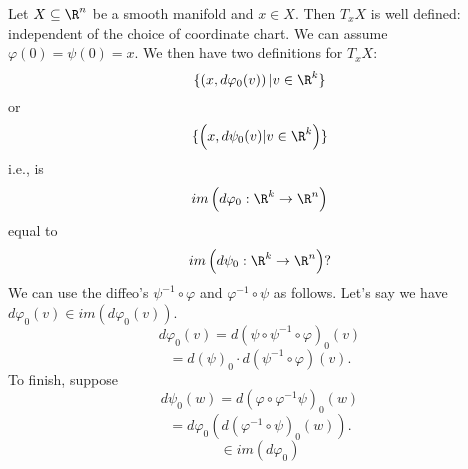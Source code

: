 \begin{proposition}
  Let $X \subseteq \R^n$ be a smooth manifold and $x\in X$. Then $T_xX$ is well defined: independent of the choice of coordinate chart.
  \newline We can assume $\varphi (0)=\psi(0)=x$. We then have two definitions for $T_xX$:
    $$\{\left(x,d   \varphi_{0}(v) \right) | v\in \R^k\}$$
    or
    $$\{\left(x,d\psi_{0}(v)| v\in \R^k\right)\}$$
    i.e., is
      $$im \left(d\varphi_0:\R^k\to \R^n\right)$$
      equal to
      $$im \left(d\psi_0:\R^k\to \R^n \right)?$$
    We can use the diffeo's $\psi^{-1}\circ \varphi$ and $\varphi ^{-1}\circ \psi$ as follows.
    Let's say we have $d \varphi _0(v)\in im(d\varphi_0(v))$.
      $$ d \varphi _0(v)=d \left(\psi \circ \psi ^{-1}\circ \varphi \right)_0(v) $$
      $$=d(\psi)_0 \cdot d \left(\psi ^{-1}\circ \varphi  \right)(v).$$
    To finish, suppose
      $$d\psi_0(w)=d \left(\varphi \circ \varphi ^{-1}\psi\right)_0(w)$$
      $$=d \varphi _0 \left(d(\varphi ^{-1}\circ \psi)_0(w)  \right).$$
      $$\in im \left(d \varphi_0\right)$$
      \qedhere
\end{proposition}

